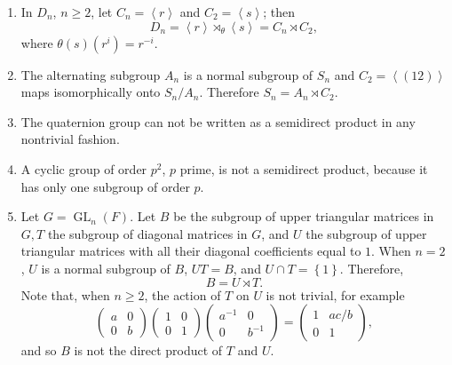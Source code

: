 \begin{example}
  \begin{enumerate}
    \item In \( D_n \), \( n \geq 2 \), let \( C_n = \left\langle r \right\rangle \) and \( C_2 = \left\langle s \right\rangle \); then
      \[
        D_n = \left\langle r \right\rangle \rtimes_{\theta} \left\langle s \right\rangle = C_n \rtimes C_2,
      \]
      where \( \theta(s)(r^i) = r^{-i} \).
    \item The alternating subgroup \( A_n \) is a normal subgroup of \( S_n \) and \( C_2 = \left\langle (12) \right\rangle \) maps isomorphically onto \( S_n / A_n \).
      Therefore \( S_n = A_n \rtimes C_2 \).
    \item The quaternion group can not be written as a semidirect product in any nontrivial fashion.
    \item A cyclic group of order \( p^2 \), \( p \) prime, is not a semidirect product, because it has only one subgroup of order \( p \).
    \item Let \( G = \operatorname{GL}_n(F) \).
      Let \( B \) be the subgroup of upper triangular matrices in \( G, T \) the subgroup of diagonal matrices in \( G \), and \( U \) the subgroup of upper triangular matrices with all their diagonal coefficients equal to \( 1 \).
      When \( n =2 \), \( U \) is a normal subgroup of \( B \), \( UT = B \), and \( U \cap T = \left\lbrace 1 \right\rbrace \).
      Therefore,
      \[
        B = U \rtimes T.
      \]
      Note that, when \( n \geq 2 \), the action of \( T \) on \( U \) is not trivial, for example
      \[
        \begin{pmatrix}
          a & 0\\ 0 & b
        \end{pmatrix} \begin{pmatrix}
          1 & 0\\ 0 & 1
        \end{pmatrix}\begin{pmatrix}
          a^{-1} & 0\\ 0 & b^{-1}
        \end{pmatrix} = \begin{pmatrix}
          1 & ac/b\\ 0 & 1
        \end{pmatrix},
      \]
      and so \( B \) is not the direct product of \( T \) and \( U \).
  \end{enumerate}
\end{example}

